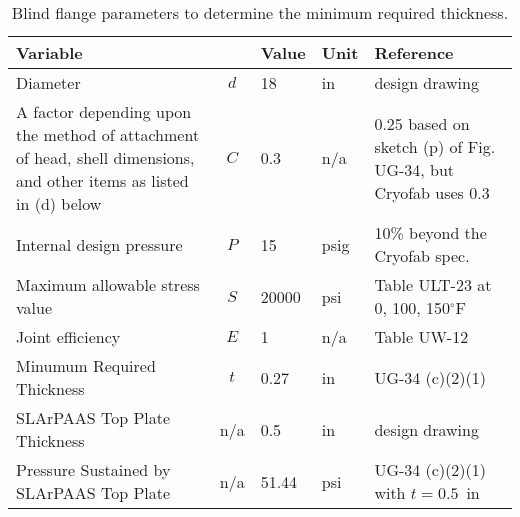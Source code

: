\begin{table}[h]
\begin{center}
\tabcolsep=10pt
\begin{tabular}{>{\raggedleft}m{5cm}|c|l|l|m{5.5cm}}
\hline
\hline
Variable & & Value & Unit & Reference \\
\hline
Diameter & $d$ & 18 & in & design drawing \\
A factor depending upon the method of attachment of head, shell dimensions, 
and other items as listed in (d) below & $C$ & 
0.3 & n/a & 0.25 based on sketch (p) of Fig. UG-34, but Cryofab uses 0.3 \\
Internal design pressure & $P$ & 15 & psig & 10\% beyond the Cryofab spec. \\
Maximum allowable stress value & $S$ & 20000 & psi & Table ULT-23 at 0, 100, 150$^{\circ}$F \\
Joint efficiency & $E$ & 1 & n/a & Table UW-12 \\
\hline
Minumum Required Thickness & $t$ & 0.27 & in & UG-34 (c)(2)(1) \\
\hline
SLArPAAS Top Plate Thickness & n/a & 0.5 & in & design drawing \\
\hline
Pressure Sustained by SLArPAAS Top Plate & n/a & 51.44 & psi & UG-34 (c)(2)(1) with $t=0.5$~in \\
\hline
\hline
\end{tabular}
\caption{Blind flange parameters to determine the minimum required thickness.}
\label{table:blind_flange}
\end{center}
\end{table}
